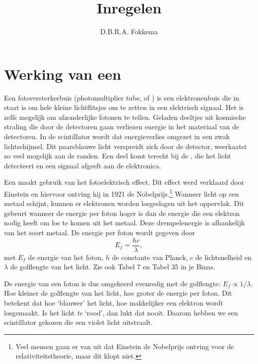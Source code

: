 

\title{Inregelen \pmts}
\author{D.B.R.A. Fokkema}



\maketitle

\section{Werking van een \pmt}

Een fotoversterkerbuis (photomultiplier tube, of \pmt) is een
elektronenbuis die in staat is om hele kleine lichtflitsjes om te zetten
in een elektrisch signaal.  Het is zelfs mogelijk om afzonderlijke fotonen
te tellen.  Geladen deeltjes uit kosmische straling die door de \hisparc
detectoren gaan verliezen energie in het materiaal van de detectoren.  In
de scintillator wordt dat energieverlies omgezet in een zwak
lichtschijnsel.  Dit paarsblauwe licht verspreidt zich door de detector,
weerkaatst zo veel mogelijk aan de randen. Een deel komt terecht bij de
\pmt, die het licht detecteert en een signaal afgeeft aan de \hisparc
elektronica.

Een \pmt maakt gebruik van het fotoelektrisch effect.  Dit effect werd
verklaard door Einstein en hiervoor ontving hij in 1921 de
Nobelprijs.\footnote{Veel mensen gaan er van uit dat Einstein de Nobelprijs
ontving voor de relativiteitstheorie, maar dit klopt niet.}  Wanneer licht
op een metaal schijnt, kunnen er elektronen worden losgeslagen uit het
oppervlak.  Dit gebeurt wanneer de energie per foton hoger is dan de
energie die een elektron nodig heeft om los te komen uit het metaal.  Deze
drempelenergie is afhankelijk van het soort metaal.  De energie per foton
wordt gegeven door
\begin{equation}
E_f = \frac{hc}{\lambda},
\end{equation}
met $E_f$ de energie van het foton, $h$ de constante van Planck, $c$ de
lichtsnelheid en $\lambda$ de golflengte van het licht.  Zie ook Tabel 7
en Tabel 35 in je Binas.

De energie van een foton is dus omgekeerd evenredig met de golflengte:
$E_f \propto 1/\lambda$.  Hoe kleiner de golflengte van het licht, hoe
groter de energie per foton.  Dit betekent dat hoe `blauwer' het licht,
hoe makkelijker een elektron wordt losgemaakt.  Is het licht \emph{te}
`rood', dan lukt dat nooit.  Daarom hebben we een scintillator gekozen die
een violet licht uitstraalt.

